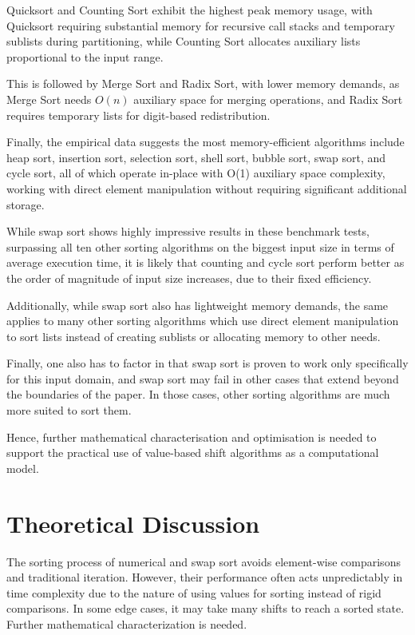\documentclass[12pt]{article}
\begin{document}
Quicksort and Counting Sort exhibit the highest peak memory usage, with Quicksort requiring substantial memory for recursive call stacks and temporary sublists during partitioning, while Counting Sort allocates auxiliary lists proportional to the input range.

This is followed by Merge Sort and Radix Sort, with lower memory demands, as Merge Sort needs $O(n)$ auxiliary space for merging operations, and Radix Sort requires temporary lists for digit-based redistribution.

Finally, the empirical data suggests the most memory-efficient algorithms include heap sort, insertion sort, selection sort, shell sort, bubble sort, swap sort, and cycle sort, all of which operate in-place with O(1) auxiliary space complexity, working with direct element manipulation without requiring significant additional storage.

While swap sort shows highly impressive results in these benchmark tests, surpassing all ten other sorting algorithms on the biggest input size in terms of average execution time, it is likely that counting and cycle sort perform better as the order of magnitude of input size increases, due to their fixed efficiency.

Additionally, while swap sort also has lightweight memory demands, the same applies to many other sorting algorithms which use direct element manipulation to sort lists instead of creating sublists or allocating memory to other needs.

Finally, one also has to factor in that swap sort is proven to work only specifically for this input domain, and swap sort may fail in other cases that extend beyond the boundaries of the paper. In those cases, other sorting algorithms are much more suited to sort them.

Hence, further mathematical characterisation and optimisation is needed to support the practical use of value-based shift algorithms as a computational model.

\section{Theoretical Discussion}
The sorting process of numerical and swap sort avoids element-wise comparisons and traditional iteration. However, their performance often acts unpredictably in time complexity due to the nature of using values for sorting instead of rigid comparisons. In some edge cases, it may take many shifts to reach a sorted state. Further mathematical characterization is needed.
\end{document}
